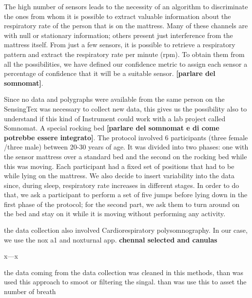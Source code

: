 \documentclass[a4paper,11pt, oneside,italian]{article}
\begin{document}
 The high number of sensors leads to the necessity of an algorithm to discriminate the ones from whom 
 it is possible to extract valuable information about the respiratory rate of the person that is on the mattress.
 Many of these channels are with null or stationary information; others present just interference from the 
 mattress itself. From just a few sensors, it is possible to retrieve a respiratory pattern and extract the 
 respiratory rate per minute (rpm). To obtain them from all the possibilities, we have defined our confidence 
 metric to assign each sensor a percentage of confidence that it will be a suitable sensor.
 \textbf{[parlare del somnomat]}.

 Since no data and polygraphs were available from the same person
 on the SensingTex was necessary to collect new data, this gives 
 us the possibility also to understand if this kind of Instrument
  could work with a lab project called Somnomat. A special 
  rocking bed \textbf{[parlare del somnomat e di come potrebbe essere integrato]}. The protocol involved 
  6 participants (three female /three male) between 20-30 years of age. It was divided into two phases: one 
  with the sensor mattress over a standard bed and the second on the rocking bed while this was moving. 
  Each participant had a fixed set of positions that had to be while lying on the mattress. 
  We also decide to insert variability into the data since, during sleep, respiratory rate increases in different stages. 
  In order to do that, we ask a participant to perform a set of five jumps before lying down in the first 
  phase of the protocol; for the second part, we ask them to turn around on the bed and stay on it 
  while it is moving without performing any activity.


  the data collection also involved Cardiorespiratory polysomnography. In our case, we use the nox a1 and noxturnal app. 
  \textbf{chennal selected and canulas}

  x---x

  the data coming from the data collection was cleaned in this methods, than was used this approach to smoot or filtering the singal.
  than was use this to asset the number of breath
\end{document}
